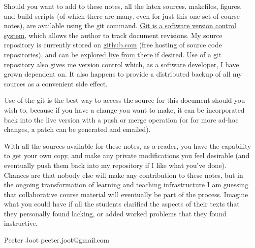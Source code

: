 Should you want to add to these notes, all the latex sources, makefiles, figures, and build scripts (of which there are many, even for just this one set of course notes), are available using the git command.  \href{http://git-scm.com/}{Git is a software version control system}, which allows the author to track document revisions.  My source repository is currently stored on \href{http://github.com}{github.com} (free hosting of source code repositories), and can be \href{https://github.com/peeterjoot/physicsplay/tree/master/notes/phy454}{explored live from there} if desired.  Use of a git repository also gives me version control which, as a software developer, I have grown dependent on.  It also happens to provide a distributed backup of all my sources as a convenient side effect.

Use of the git is the best way to access the source for this document should you wish to, because if you have a change you want to make, it can be incorporated back into the live version with a push or merge operation (or for more ad-hoc changes, a patch can be generated and emailed).

With all the sources available for these notes, as a reader, you have the capability to get your own copy, and make any private modifications you feel desirable (and eventually push them back into my repository if I like what you've done).  Chances are that nobody else will make any contribution to these notes, but in the ongoing transformation of learning and teaching infrastructure I am guessing that collaborative course material will eventually be part of the process.  Imagine what you could have if all the students clarified the aspects of their texts that they personally found lacking, or added worked problems that they found instructive.

Peeter Joot  \quad peeter.joot@gmail.com 

